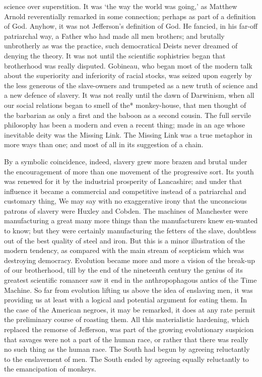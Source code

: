 \documentclass{book}
\begin{document}
science over superstition. It was ‘the way the world was going,’ as Matthew Arnold reverentially remarked in some connection; perhaps as part of a definition of God. Anyhow, it was not Jefferson’s definition of God. He fancied, in his far-off patriarchal way, a Father who had made all men brothers; and brutally unbrotherly as was the practice, such democratical Deists never dreamed of denying the theory. It was not until the scientific sophistries began that brotherhood was really disputed. Gobineau, who began most of the modern talk about the superiority and inferiority of racial stocks, was seized upon eagerly by the less generous of the slave-owners and trumpeted as a new truth of science and a new defence of slavery. It was not really until the dawn of Darwinism, when all our social relations began to smell of the* monkey-house, that men thought of the barbarian as only a first and the baboon as a second cousin. The full servile philosophy has been a modern and even a recent thing; made in an age whose inevitable deity was the Missing Link. The Missing Link was a true metaphor in more ways than one; and most of all in its suggestion of a chain.

By a symbolic coincidence, indeed, slavery grew more brazen and brutal under the encouragement of more than one movement of the progressive sort. Its youth was renewed for it by the industrial prosperity of Lancashire; and under that influence it became a commercial and competitive instead of a patriarchal and customary thing, We may say with no exaggerative irony that the unconscious patrons of slavery were Huxley and Cobden. The machines of Manchester were manufacturing a great many more things than the manufacturers knew en-wanted to know; but they were certainly manufacturing the fetters of the slave, doubtless out of the best quality of steel and iron. But this is a minor illustration of the modern tendency, as compared with the main stream of scepticism which was destroying democracy. Evolution became more and more a vision of the break-up of our brotherhood, till by the end of the nineteenth century the genius of its greatest scientific romancer saw it end in the anthropophagous antics of the Time Machine. So far from evolution lifting us above the idea of enslaving men, it was providing us at least with a logical and potential argument for eating them. In the case of the American negroes, it may be remarked, it does at any rate permit the preliminary course of roasting them. All this materialistic hardening, which replaced the remorse of Jefferson, was part of the growing evolutionary suspicion that savages were not a part of the human race, or rather that there was really no such thing as the human race. The South had begun by agreeing reluctantly to the enslavement of men. The South ended by agreeing equally reluctantly to the emancipation of monkeys.
\end{document}
